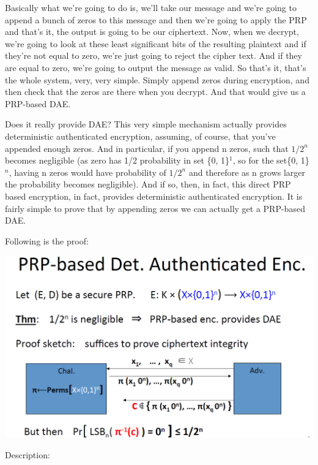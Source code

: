\documentclass[11pt]{article}
\makeatletter
\def\maxwidth{\ifdim\Gin@nat@width>\linewidth\linewidth
    \else\Gin@nat@width\fi}
\let\Oldincludegraphics\includegraphics
\renewcommand{\includegraphics}[1]{\Oldincludegraphics[width=.8\maxwidth]{#1}}
\makeatother
\begin{document}
Basically what we're going to do is, we'll take our message and we're
going to append a bunch of zeros to this message and then we're going to
apply the PRP and that's it, the output is going to be our ciphertext.
Now, when we decrypt, we're going to look at these least significant
bits of the resulting plaintext and if they're not equal to zero, we're
just going to reject the cipher text. And if they are equal to zero,
we're going to output the message as valid. So that's it, that's the
whole system, very, very simple. Simply append zeros during encryption,
and then check that the zeros are there when you decrypt. And that would
give us a PRP-based DAE.

Does it really provide DAE? This very simple mechanism actually provides
deterministic authenticated encryption, assuming, of course, that you've
appended enough zeros. And in particular, if you append n zeros, such
that \(1/2^{n}\) becomes negligible (as zero has 1/2 probability in set
\{0, 1\}\(^1\), so for the set\{0, 1\}\(^n\), having n zeros would have
probability of \(1/2^{n}\) and therefore as n grows larger the
probability becomes negligible). And if so, then, in fact, this direct
PRP based encryption, in fact, provides deterministic authenticated
encryption. It is fairly simple to prove that by appending zeros we can
actually get a PRP-based DAE.

Following is the proof:

\includegraphics{./Images/Proof-PRPbasedDAE.png}

Description:
\end{document}
